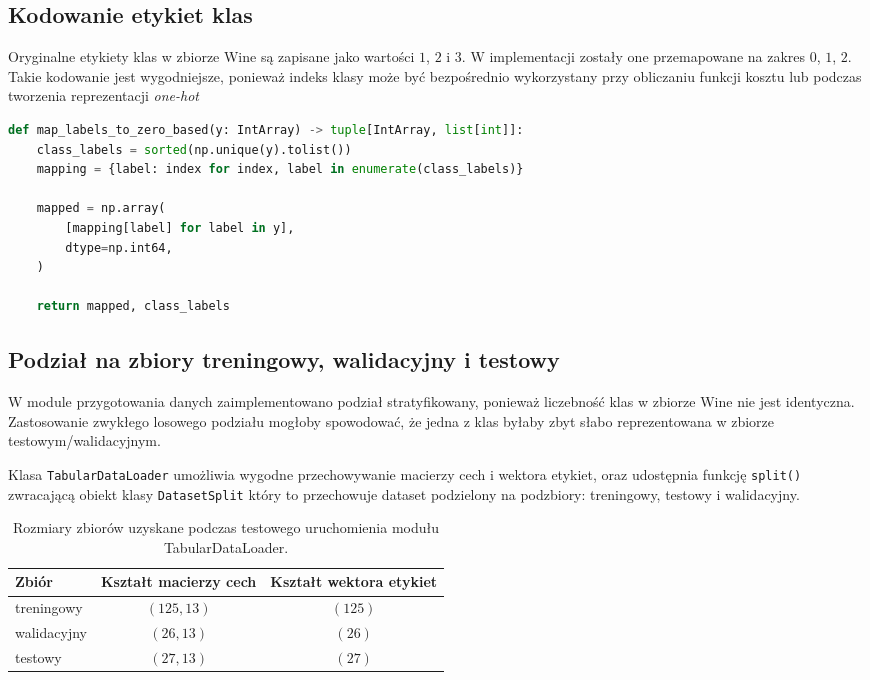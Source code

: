 \subsection{Kodowanie etykiet klas}

Oryginalne etykiety klas w zbiorze Wine są zapisane jako wartości $1$, $2$ i $3$. W implementacji zostały one przemapowane na zakres $0$, $1$, $2$. Takie kodowanie jest wygodniejsze, ponieważ indeks klasy może być bezpośrednio wykorzystany przy obliczaniu funkcji kosztu lub podczas tworzenia reprezentacji \textit{one-hot}

\begin{lstlisting}[language=Python, caption={Mapowanie etykiet klas na numerację od zera.}, label={lst:map_labels}, basicstyle=\ttfamily\small, breaklines=true, frame=single]
def map_labels_to_zero_based(y: IntArray) -> tuple[IntArray, list[int]]:
    class_labels = sorted(np.unique(y).tolist())
    mapping = {label: index for index, label in enumerate(class_labels)}

    mapped = np.array(
        [mapping[label] for label in y],
        dtype=np.int64,
    )

    return mapped, class_labels
\end{lstlisting}

\subsection{Podział na zbiory treningowy, walidacyjny i testowy}

W module przygotowania danych zaimplementowano podział stratyfikowany, ponieważ liczebność klas w zbiorze Wine nie jest identyczna. Zastosowanie zwykłego losowego podziału mogłoby spowodować, że jedna z klas byłaby zbyt słabo reprezentowana w zbiorze testowym/walidacyjnym.

Klasa \texttt{TabularDataLoader} umożliwia wygodne przechowywanie macierzy cech i wektora etykiet, oraz udostępnia funkcję \texttt{split()} zwracającą obiekt klasy \texttt{DatasetSplit} który to przechowuje dataset podzielony na podzbiory: treningowy, testowy i walidacyjny. 

\begin{table}[htbp]
    \centering
    \caption{Rozmiary zbiorów uzyskane podczas testowego uruchomienia modułu TabularDataLoader.}
    \label{tab:dataloader_split_shapes}
    \begin{tabular}{lcc}
        \toprule
        Zbiór & Kształt macierzy cech & Kształt wektora etykiet \\
        \midrule
        treningowy & $(125, 13)$ & $(125)$ \\
        walidacyjny & $(26, 13)$ & $(26)$ \\
        testowy & $(27, 13)$ & $(27)$ \\
        \bottomrule
    \end{tabular}
\end{table}

